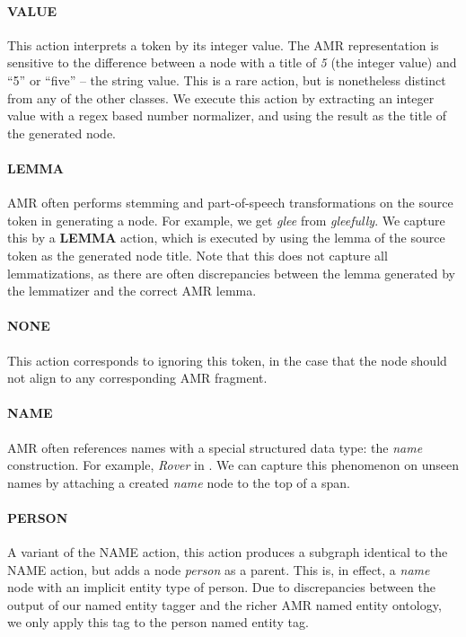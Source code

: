 \documentclass[11pt]{article}
\newcommand\w[1]{\textit{#1}} %
\newcommand\n[1]{\textit{#1}} %
\begin{document}
\paragraph{VALUE} This action interprets a token by its integer value. 
The AMR representation is sensitive to the difference between a node with a title
  of \n{5} (the integer value) and ``5'' or ``five'' -- the string value.
This is a rare action, but is nonetheless distinct from any of the other classes.
We execute this action by extracting an integer value with a regex based number normalizer, and using the result as the title of the generated node.

\paragraph{LEMMA} AMR often performs stemming and part-of-speech transformations on the source token in generating a node. 
For example, we get \n{glee} from \w{gleefully}.
We capture this by a \textbf{LEMMA} action, which is executed by using the lemma of the source token as the generated node title.
Note that this does not capture all lemmatizations, as there are often discrepancies
  between the lemma generated by the lemmatizer and the correct AMR lemma.

\paragraph{NONE} This action corresponds to ignoring this token, in the case that
  the node should not align to any corresponding AMR fragment.

\paragraph{NAME} AMR often references names with a special structured data type: the \n{name} construction. 
For example, \w{Rover} in .
We can capture this phenomenon on unseen names by attaching a created \n{name} node to the top of a span.

\paragraph{PERSON} A variant of the NAME action, this action produces a subgraph identical to the NAME action, but adds a node \n{person} as a parent. This is, in effect, a \n{name} node with an implicit entity type of person. Due to discrepancies between the output of our named entity tagger and the richer AMR named entity ontology, we only apply this tag to the person named entity tag.
\end{document}
